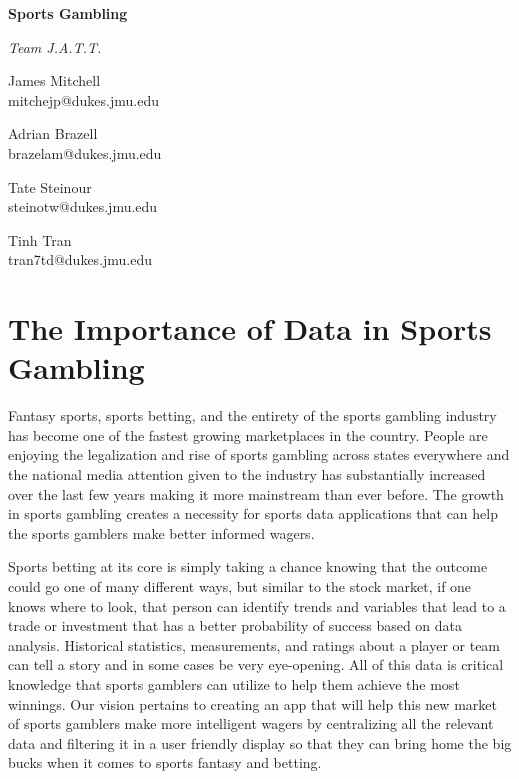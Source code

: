 \documentclass[11pt]{article}
\begin{document}
\begin{center}
\bfseries\huge
Sports Gambling
\end{center}

\begin{center}
\itshape\large
Team J.A.T.T.
\end{center}

\begin{multicols}{4}
\centering

James Mitchell \\
{\footnotesize mitchejp@dukes.jmu.edu}

Adrian Brazell \\
{\footnotesize brazelam@dukes.jmu.edu}

Tate Steinour \\
{\footnotesize steinotw@dukes.jmu.edu}

Tinh Tran \\
{\footnotesize tran7td@dukes.jmu.edu}

\end{multicols}

\section*{The Importance of Data in Sports Gambling}

Fantasy sports, sports betting, and the entirety of the sports gambling industry has become one of the fastest growing marketplaces in the country. People are enjoying the legalization and rise of sports gambling across states everywhere and the national media attention given to the industry has substantially increased over the last few years making it more mainstream than ever before. The growth in sports gambling creates a necessity for sports data applications that can help the sports gamblers make better informed wagers. 

Sports betting at its core is simply taking a chance knowing that the outcome could go one of many different ways, but similar to the stock market, if one knows where to look, that person can identify trends and variables that lead to a trade or investment that has a better probability of success based on data analysis. Historical statistics, measurements, and ratings about a player or team can tell a story and in some cases be very eye-opening. All of this data is critical knowledge that sports gamblers can utilize to help them achieve the most winnings. Our vision pertains to creating an app that will help this new market of sports gamblers make more intelligent wagers by centralizing all the relevant data and filtering it in a user friendly display so that they can bring home the big bucks when it comes to sports fantasy and betting.
\end{document}
